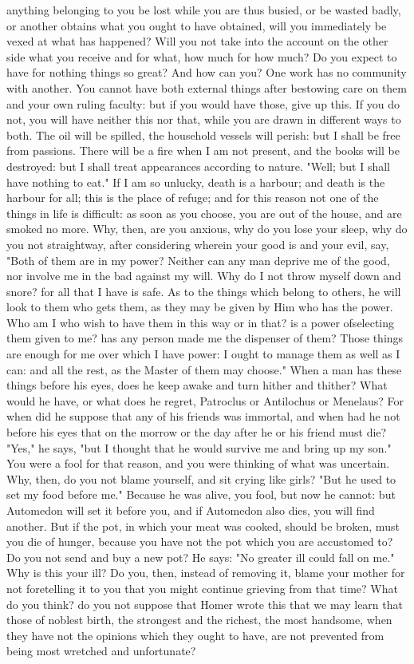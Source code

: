 \documentclass[a4paper]{article}
\begin{document}
anything belonging to you be lost while you are thus busied, or be wasted
badly, or another obtains what you ought to have obtained, will you immediately
be vexed at what has happened? Will you not take into the account on the other
side what you receive and for what, how much for how much? Do you expect to
have for nothing things so great? And how can you? One work has no community
with another. You cannot have both external things after bestowing care on them
and your own ruling faculty: but if you would have those, give up this. If you
do not, you will have neither this nor that, while you are drawn in different
ways to both. The oil will be spilled, the household vessels will perish: but I
shall be free from passions. There will be a fire when I am not present, and
the books will be destroyed: but I shall treat appearances according to nature.
"Well; but I shall have nothing to eat." If I am so unlucky, death is a
harbour; and death is the harbour for all; this is the place of refuge; and for
this reason not one of the things in life is difficult: as soon as you choose,
you are out of the house, and are smoked no more. Why, then, are you anxious,
why do you lose your sleep, why do you not straightway, after considering
wherein your good is and your evil, say, "Both of them are in my power? Neither
can any man deprive me of the good, nor involve me in the bad against my will.
Why do I not throw myself down and snore? for all that I have is safe. As to
the things which belong to others, he will look to them who gets them, as they
may be given by Him who has the power. Who am I who wish to have them in this
way or in that? is a power ofselecting them given to me? has any person made me
the dispenser of them? Those things are enough for me over which I have power:
I ought to manage them as well as I can: and all the rest, as the Master of
them may choose."
    When a man has these things before his eyes, does he keep awake and turn
hither and thither? What would he have, or what does he regret, Patroclus or
Antilochus or Menelaus? For when did he suppose that any of his friends was
immortal, and when had he not before his eyes that on the morrow or the day
after he or his friend must die? "Yes," he says, "but I thought that he would
survive me and bring up my son." You were a fool for that reason, and you were
thinking of what was uncertain. Why, then, do you not blame yourself, and sit
crying like girls? "But he used to set my food before me." Because he was
alive, you fool, but now he cannot: but Automedon will set it before you, and
if Automedon also dies, you will find another. But if the pot, in which your
meat was cooked, should be broken, must you die of hunger, because you have not
the pot which you are accustomed to? Do you not send and buy a new pot? He
says:
       "No greater ill could fall on me."
Why is this your ill? Do you, then, instead of removing it, blame your mother
for not foretelling it to you that you might continue grieving from that time?
What do you think? do you not suppose that Homer wrote this that we may learn
that those of noblest birth, the strongest and the richest, the most handsome,
when they have not the opinions which they ought to have, are not prevented
from being most wretched and unfortunate?
\end{document}
